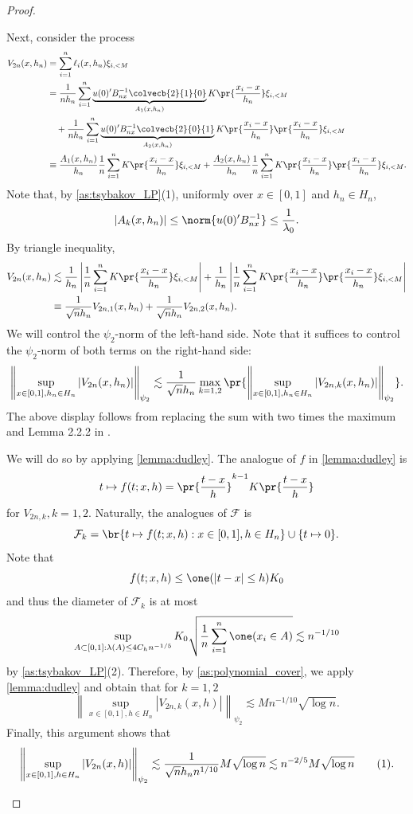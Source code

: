 \documentclass[12pt, reqno]{amsart}
\newcommand\numberthis{\addtocounter{equation}{1}\tag{\theequation}}
\newcommand{\absauto}[1]{\left| #1 \right|}
\newcommand{\normauto}[1]{\left\lVert #1 \right\rVert}
\numberwithin{equation}{section}
\begin{document}
\begin{refsection}
\begin{appendices}
\begin{proof}
\begin{enumerate}[wide]
Next, consider the process \begin{align*}
V_{2n}(x, h_n) &= \sum_{i=1}^n \ell_i(x,h_n) \xi_{i, <M} \\&= \frac{1}{nh_n}\sum_{i=1}^n
\underbrace{u
(0)'
B_{nx}^{-1}
\colvecb{2}{1}{0}}_{A_1(x, h_n)} K\pr{\frac{x_i - x}{h_n}} \xi_{i, <M} \\
&\quad + \frac{1}{nh_n}\sum_{i=1}^n \underbrace{u
(0)'
B_{nx}^{-1}
\colvecb{2}{0}{1}}_{A_2(x, h_n)} K\pr{\frac{x_i - x}{h_n}}\pr{\frac{x_i - x}{h_n}} \xi_{i,
<M} \\
&\equiv \frac{A_{1}(x, h_n)}{h_n} \frac{1}{n}\sum_{i=1}^n K\pr{\frac{x_i - x}{h_n}} \xi_
{i, <M} + \frac{A_{2}(x, h_n)}{h_n} \frac{1}{n}\sum_{i=1}^n K\pr{\frac{x_i - x}{h_n}} \pr{\frac{x_i - x}{h_n}} \xi_
{i, <M}.
\end{align*}
Note that, by \cref{as:tsybakov_LP}(1), uniformly over $x \in [0,1]$ and $h_n \in H_n$,
\[
|A_k(x, h_n)| \le \norm{u(0)' B_{nx}^{-1}} \le \frac{1}{\lambda_0}.
\]
By triangle inequality, \begin{align*}
V_{2n}(x, h_n) &\lesssim \frac{1}{h_n} \absauto{\frac{1}{n}\sum_{i=1}^n K\pr{
\frac{x_i - x}{h_n}} \xi_
{i, <M}} + \frac{1}{h_n} \absauto{\frac{1}{n}\sum_{i=1}^n K\pr{
\frac{x_i - x}{h_n}} \pr{\frac{x_i - x}{h_n}} \xi_
{i, <M}} \\
&\equiv \frac{1}{\sqrt{n} h_n} V_{2n, 1}(x, h_n) + \frac{1}{\sqrt{n} h_n} V_{2n, 2}(x, h_n).
\end{align*}
We will control the $\psi_2$-norm of the left-hand side. Note that it suffices to control
the $\psi_2$-norm of both terms on the right-hand side: \[
\normauto{\sup_{x \in [0,1], h_n \in H_n} |V_{2n}(x, h_n)|}_{\psi_2} \lesssim \frac{1}{
\sqrt{n} h_n}
\max_{k = 1,2}\pr{
  \normauto{\sup_{x \in [0,1], h_n \in H_n} |V_{2n, k}(x, h_n)|}_{\psi_2}
}.
\]
The above display follows from replacing the sum with two times the maximum and Lemma
2.2.2 in \citet{vaart1996weak}.

We will do so by applying \cref{lemma:dudley}. The analogue of $f$ in \cref{lemma:dudley}
is \[
t\mapsto f(t; x,h) = \pr{\frac{t-x}{h}}^{k-1} K\pr{\frac{t-x}{h}}
\]
for $V_{2n, k}, k = 1,2$. Naturally, the analogues of $\mathcal F$ is \[
\mathcal F_k = \br{t\mapsto f(t; x,h) : x \in [0,1], h\in H_n} \cup \{t \mapsto 0\}.
\]
Note that \[
f(t; x,h) \le \one(|t-x| \le h) K_0
\]
and thus the diameter of $\mathcal F_k$ is at most \[
\sup_{A\subset [0,1] : \lambda(A) \le 4C_h n^{-1/5}} K_0 \sqrt{\frac{1}{n}\sum_{i=1}^n
\one(x_i \in A)} \lesssim n^{-1/10}
\]
by \cref{as:tsybakov_LP}(2). Therefore, by \cref{as:polynomial_cover}, we apply
\cref{lemma:dudley} and obtain that for $k = 1,2$ \[
\normauto{\sup_{x\in [0,1], h \in H_n} |V_{2n,k}(x,h)|}_{\psi_2} \lesssim M n^{-1/10}
\sqrt{\log n}.
\]
Finally, this argument shows that \[
\normauto{\sup_{x \in [0,1], h \in H_n} |V_{2n}(x, h)|}_{\psi_2} \lesssim \frac{1}
{\sqrt{n } h_n n^{1/10}} M \sqrt{\log n} \lesssim n^{-2/5} M \sqrt{\log n} \numberthis
\label{eq:llr_bbd_term}.
\]


\end{enumerate}
\end{proof}
\end{appendices}
\end{refsection}
\end{document}
